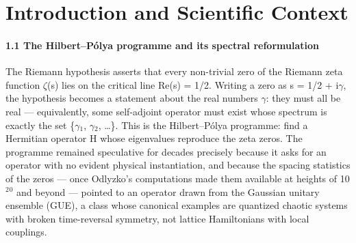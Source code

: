 \documentclass[10pt]{article}
\begin{document}
\begin{abstract}
AB-Cloud research repository, archived dataset under DOI 10.5281/zenodo.21825394.

\smallskip\noindent\textbf{Keywords:} \emph{Riemann zeta function; Hilbert--P\'olya programme; Berry--Keating operator; Aharonov--Bohm lattice; Gaussian unitary ensemble; spectral statistics; computational verification; verification protocol; reproducibility}

\smallskip\noindent\textbf{Data and code availability.} All source code, the complete run archive (run\_20260914\_234626), and the per-test artefacts are openly available at \url{https://github.com/wild8highlander/ab-cloud-research} (research record: \url{https://github.com/wild8highlander/research-papers}); the archived dataset carries DOI \url{https://doi.org/10.5281/zenodo.21825394}. The complete 31,239-line source is reproduced in Appendix~B; the Python reimplementation ships with the package (Appendix~D); the complete reference-run archive --- all 38 test folders, the four-format final report, the consolidated logs, and the audit-tier captures --- ships inside the package at \texttt{run\_data/run\_20260914\_234626/} (Appendix~E).
\end{abstract}

\newpage
\tableofcontents
\newpage

\section{Introduction and Scientific Context}

\paragraph{1.1 The Hilbert--P\'olya programme and its spectral reformulation}

The Riemann hypothesis asserts that every non-trivial zero of the Riemann zeta function $\zeta$(s) lies on the critical line Re(s) = 1/2. Writing a zero as s = 1/2 + i$\gamma$, the hypothesis becomes a statement about the real numbers $\gamma$: they must all be real --- equivalently, some self-adjoint operator must exist whose spectrum is exactly the set \{$\gamma$$_1$, $\gamma$$_2$, \ldots{}\}. This is the Hilbert--P\'olya programme: find a Hermitian operator H whose eigenvalues reproduce the zeta zeros. The programme remained speculative for decades precisely because it asks for an operator with no evident physical instantiation, and because the spacing statistics of the zeros --- once Odlyzko's computations made them available at heights of 10$^2$$^0$ and beyond --- pointed to an operator drawn from the Gaussian unitary ensemble (GUE), a class whose canonical examples are quantized chaotic systems with broken time-reversal symmetry, not lattice Hamiltonians with local couplings.
\end{document}
